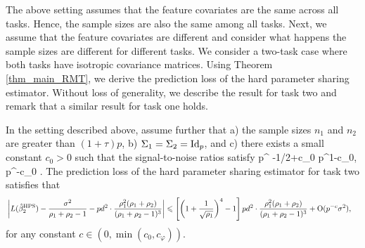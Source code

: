 The above setting assumes that the feature covariates are the same across all tasks.
Hence, the sample sizes are also the same among all tasks.
Next, we assume that the feature covariates are different and consider what happens the sample sizes are different for different tasks.
We consider a two-task case where both tasks have isotropic covariance matrices.
Using Theorem \ref{thm_main_RMT}, we derive the prediction loss of the hard parameter sharing estimator.
Without loss of generality, we describe the result for task two and remark that a similar result for task one holds.

\begin{corollary}\label{cor_MTL_loss}
	In the setting described above, assume further that a) the sample sizes $n_1$ and $n_2$ are greater than $(1 + \tau) p$, b) $\Sigma_1=\Sigma_2=\operatorname{Id}_p$, and c) there exists a small constant $c_0>0$ such that the signal-to-noise ratios satisfy 
	\be\label{choiceofpara0}
		p^{ -1/2+c_0} \le {}  \le p^{1-c_0},\quad  {} \le p^{-c_0} .
	\ee
	The prediction loss of the hard parameter sharing estimator for task two satisfies that
	\begin{align}\label{cor_MTL_error}
	 & \left|L(\hat{\beta}_2^{\textup{HPS}}) -\frac{\sigma^2}{\rho_1+\rho_2-1} - pd^2\cdot \frac{\rho_1^2 (\rho_1+\rho_2)}{(\rho_1 + \rho_2 - 1)^3}\right|  \leqslant  \left[\left( 1+\frac{1}{\sqrt{\rho_1}}\right)^4-1\right] pd^2\cdot \frac{\rho_1^2 (\rho_1+\rho_2)}{(\rho_1 + \rho_2 - 1)^3} +\operatorname{O}(p^{-c}\sigma^2 ),
	 \end{align}
	 for any constant $c\in (0,\min(c_0,c_\varphi))$.
\end{corollary}


